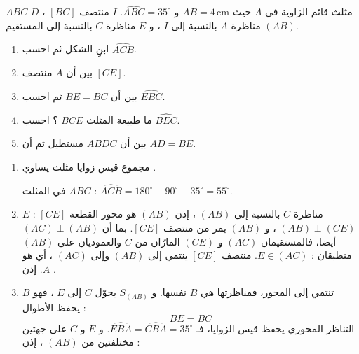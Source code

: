 \documentclass[12pt,a4paper]{article}
\newcommand{\cm}{\,\mathrm{cm}}
\begin{document}
\begin{corr}[title={تركيب : مثلث قائم ومناظراته}, stars=3, source={Axiomaths}]
$ABC$ مثلث قائم الزاوية في $A$ حيث $AB=4\cm$ و $\widehat{ABC}=35^\circ$. $I$ منتصف $[BC]$ ، $D$ مناظرة $A$ بالنسبة إلى $I$ ، و $E$ مناظرة $C$ بالنسبة إلى المستقيم $(AB)$.
\begin{enumerate}
  \item ابنِ الشكل ثم احسب $\widehat{ACB}$.
  \item بين أن $A$ منتصف $[CE]$.
  \item بين أن $BE=BC$ ثم احسب $\widehat{EBC}$.
  \item ما طبيعة المثلث $BCE$ ؟ احسب $\widehat{BEC}$.
  \item بين أن $ABDC$ مستطيل ثم أن $AD=BE$.
\end{enumerate}
\axsol
\begin{enumerate}[itemsep=14pt]
  \item\leavevmode
  \begin{prop}
  مجموع قيس زوايا مثلث يساوي .
  \end{prop}
  في المثلث $ABC$ : $\widehat{ACB}=180^\circ-90^\circ-35^\circ=55^\circ$.
  \begin{center}
  \end{center}
  \item $E$ مناظرة $C$ بالنسبة إلى $(AB)$ ، إذن $(AB)$ هو محور القطعة $[CE]$ : $(AB)\perp(CE)$ ، و $(AB)$ يمر من منتصف $[CE]$.
  بما أن $(AC)\perp(AB)$ أيضا، فالمستقيمان $(AC)$ و $(CE)$ المارّان من $C$ والعموديان على $(AB)$ منطبقان : $E\in(AC)$.
  منتصف $[CE]$ ينتمي إلى $(AB)$ وإلى $(AC)$ ، أي هو $A$. إذن .
  \item $B$ تنتمي إلى المحور، فمناظرتها هي $B$ نفسها. و $S_{(AB)}$ يحوّل $C$ إلى $E$ ، فهو يحفظ الأطوال :
  \[BE=BC\]
  التناظر المحوري يحفظ قيس الزوايا، فـ $\widehat{EBA}=\widehat{CBA}=35^\circ$. و $E$ و $C$ على جهتين مختلفتين من $(AB)$ ، إذن :

\end{enumerate}
\end{corr}
\end{document}
